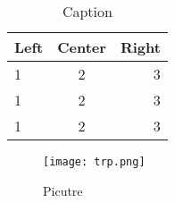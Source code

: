 \documentclass[dvipdfmx,12pt]{ujarticle}
\begin{document}
\begin{table}[ht]
    \caption{Caption}
    \label{SampleTable}
    \centering
    \begin{tabular}{lcr}
        \hline
        Left & Center & Right \\
        \hline \hline
        1 & 2 & 3 \\
        1 & 2 & 3 \\
        1 & 2 & 3 \\
        \hline
    \end{tabular}
\end{table}

\begin{figure}[ht]
    \centering
    \texttt{[image: trp.png]}
    \caption{Picutre}
    \label{SampleFigure}
\end{figure}
\end{document}
